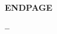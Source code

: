 \clearpage
\label{page:lastpage}
\begin{center}
  \begin{Large}

    \vspace{25mm}

     \textbf{ENDPAGE}

     \vspace{25mm}

    \textbf{\ProjectAcronym}

    \bigskip
    \textbf{\ECCall--\GrantNo}


     \medskip
     \DeliverableNumber \DeliverableName
     
   \end{Large}
\end{center}



